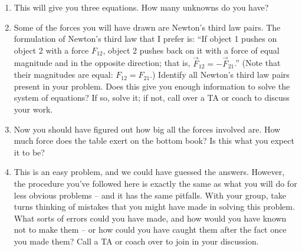 \documentclass[12pt]{article}
\newcommand{\vsi}{\vspace{1in}}
\begin{document}
\begin{enumerate}
\vsi\vsi

\item This will give you three equations. How many unknowns do you have? 

\vsi

\item Some of the forces you will have drawn are Newton's third law pairs. The formulation of Newton's third law that I prefer is: ``If object 1 pushes on object 2 with a force $F_{12}$, object 2 pushes back on it with a force of 
equal magnitude and in the opposite direction; that is, $\vec F_{12} = - \vec F_{21}$.'' (Note that their magnitudes are equal: $F_{12}=F_{21}$.)  
Identify all Newton's third law pairs present in your problem. Does this give you enough information to solve the system of equations? If so, solve it; if not, call over a TA or coach to discuss your work.

\vsi\vsi\vsi\vsi

\item Now you should have figured out how big all the forces involved are. How much force does the table exert on the bottom book? Is this what you expect it to be?

\vsi
\newpage

\item This is an easy problem, and we could have guessed the answers. However, the procedure you've followed here is exactly the same as what you will do for less obvious problems -- and it has the same pitfalls. With your 
group, take turns thinking of mistakes that you might have made in solving this problem. What sorts of errors could you have made, and how would you have known not to make them -- or how could you have caught them after the
fact once you made them? Call a TA or coach over to join in your discussion.

\end{enumerate}
\end{document}
